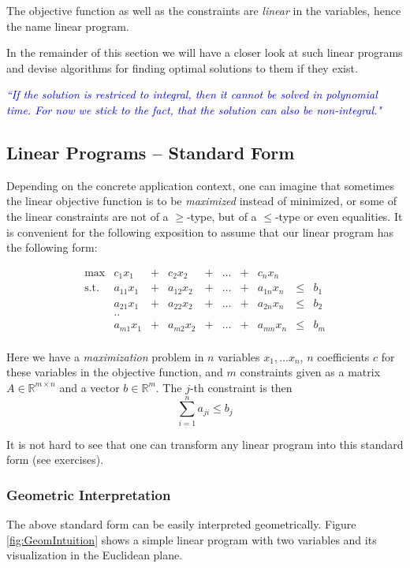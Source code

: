 \documentclass{article}
\begin{document}
The objective function as well as the constraints are \emph{linear} in the variables,
hence the name linear program.

In the remainder of this section we will have a closer look at such linear programs
and devise algorithms for finding optimal solutions to them if they exist.

\textcolor{blue}{\emph{``If the solution is restriced to integral, then it cannot be solved in polynomial time. For now we stick to the fact, that the solution can also be non-integral."}}


\subsection{Linear Programs -- Standard Form}
\label{sec:standard form}
Depending on the concrete application context, one can imagine that sometimes the linear
objective function is to be \emph{maximized} instead of minimized, or some of the 
linear constraints are not of a $\geq$-type, but of a $\leq$-type or even equalities.
It is convenient for the following exposition to assume that our linear program has the
following form:

\[
\begin{matrix}
	\max	& c_1 x_1 &+& c_2 x_2 &+& \dots &+& c_n x_n&&\\  
	\mbox{s.t.}	& a_{11} x_1 &+& a_{12} x_2&+& \dots &+&a_{1n} x_n&\leq&b_1\\
			& a_{21} x_1 &+& a_{22} x_2&+& \dots &+&a_{2n} x_n&\leq&b_2\\
			& ..	&&&&&&&&\\
			& a_{m1} x_1 &+& a_{m2} x_2&+& \dots &+&a_{mn} x_n&\leq&b_m\\
\end{matrix}
\]

Here we have a \emph{maximization} problem in $n$ variables $x_1, \dots x_n$, 
$n$ coefficients $c$ for these variables in the objective function, and $m$ constraints 
given as a matrix $A\in\mathbb{R}^{m \times n}$ and a vector $b\in\mathbb{R}^m$.
The $j$-th constraint is then 
\[
	\sum_{i=1}^n a_{ji}\leq b_j
\]

It is not hard to see that one can transform any linear program into this standard form
(see exercises).

\subsubsection{Geometric Interpretation}
The above standard form can be easily interpreted geometrically.
Figure \ref{fig:GeomIntuition} shows a simple linear program with two variables
and its visualization in the Euclidean plane. 
\end{document}
